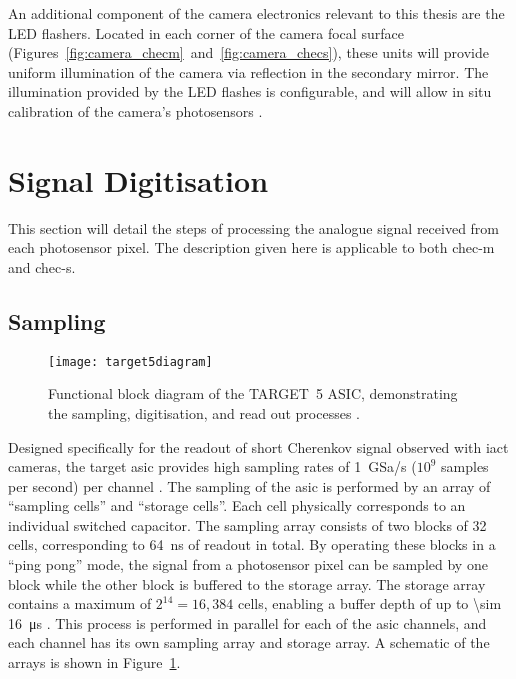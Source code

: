 An additional component of the camera electronics relevant to this thesis are the LED flashers. Located in each corner of the camera focal surface (Figures~\ref{fig:camera_checm}~and~\ref{fig:camera_checs}), these units will provide uniform illumination of the camera via reflection in the secondary mirror. The illumination provided by the LED flashes is configurable, and will allow in situ calibration of the camera's photosensors \cite{Brown2016a}.

\section{Signal Digitisation}

This section will detail the steps of processing the analogue signal received from each photosensor pixel. The description given here is applicable to both \gls{chec-m} and \gls{chec-s}.

\subsection{Sampling}

\begin{figure}
	\centering\texttt{[image: target5diagram]} 
	\caption[Functional block diagram of the TARGET~5 ASIC.]{Functional block diagram of the TARGET~5 ASIC, demonstrating the sampling, digitisation, and read out processes \cite{Albert2017}.}
	\label{fig:target5diagram}
\end{figure}

Designed specifically for the readout of short Cherenkov signal observed with \gls{iact} cameras, the \gls{target} \gls{asic} provides high sampling rates of \SI{1}{GSa/s} ($10^9$ samples per second) per channel \cite{Funk2017}. The sampling of the \gls{asic} is performed by an array of ``sampling cells'' and ``storage cells''. Each cell physically corresponds to an individual switched capacitor. The sampling array consists of two blocks of 32 cells, corresponding to \SI{64}{ns} of readout in total. By operating these blocks in a ``ping pong'' mode, the signal from a photosensor pixel can be sampled by one block while the other block is buffered to the storage array. The storage array contains a maximum of $2^{14} = 16,384$ cells, enabling a buffer depth of up to \SI{\sim 16}{\micro s} \cite{Funk2017}. This process is performed in parallel for each of the \gls{asic} channels, and each channel has its own sampling array and storage array. A schematic of the arrays is shown in Figure~\ref{fig:target5diagram}.

